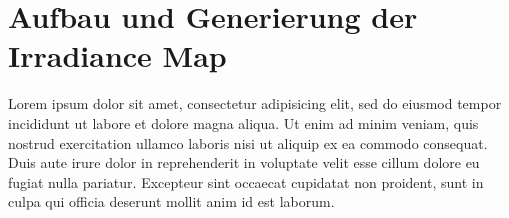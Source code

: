 \section{Aufbau und Generierung der Irradiance Map} %
\label{sec:aufbau_und_generierung_der_irradiance_map}

	Lorem ipsum dolor sit amet, consectetur adipisicing elit, sed do eiusmod
	tempor incididunt ut labore et dolore magna aliqua. Ut enim ad minim veniam,
	quis nostrud exercitation ullamco laboris nisi ut aliquip ex ea commodo
	consequat. Duis aute irure dolor in reprehenderit in voluptate velit esse
	cillum dolore eu fugiat nulla pariatur. Excepteur sint occaecat cupidatat non
	proident, sunt in culpa qui officia deserunt mollit anim id est laborum.

